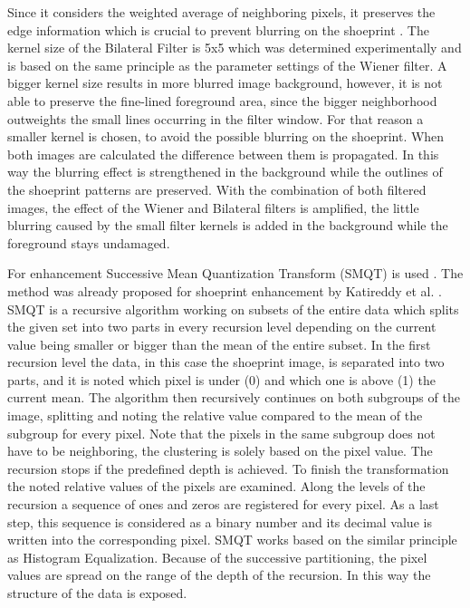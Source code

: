 \documentclass[draft,final]{vutinfth} %
\begin{document}
Since it considers the weighted average of neighboring pixels, it preserves the edge information which is crucial to prevent blurring on the shoeprint \cite{elad2002origin}. 
The kernel size of the Bilateral Filter is 5x5 which was determined experimentally and is based on the same principle as the parameter settings of the Wiener filter.
A bigger kernel size results in more blurred image background, however, it is not able to preserve the fine-lined foreground area, since the bigger neighborhood outweights the small lines occurring in the filter window.
For that reason a smaller kernel is chosen, to avoid the possible blurring on the shoeprint.
When both images are calculated the difference between them is propagated.
In this way the blurring effect is strengthened in the background while the outlines of the shoeprint patterns are preserved.
With the combination of both filtered images, the effect of the Wiener and Bilateral filters is amplified, the little blurring caused by the small filter kernels is added in the background while the foreground stays undamaged.
\par
For enhancement Successive Mean Quantization Transform (SMQT) is used \cite{nilsson2013smqt}.
The method was already proposed for shoeprint enhancement by Katireddy et al. \cite{katireddy2017novel}.
SMQT is a recursive algorithm working on subsets of the entire data which splits the given set into two parts in every recursion level depending on the current value being smaller or bigger than the mean of the entire subset.
In the first recursion level the data, in this case the shoeprint image, is separated into two parts, and it is noted which pixel is under (0) and which one is above (1) the current mean.
The algorithm then recursively continues on both subgroups of the image, splitting and noting the relative value compared to the mean of the subgroup  for every pixel.
Note that the pixels in the same subgroup does not have to be neighboring, the clustering is solely based on the pixel value.
The recursion stops if the predefined depth is achieved.
To finish the transformation the noted relative values of the pixels are examined.
Along the levels of the recursion a sequence of ones and zeros are registered for every pixel.
As a last step, this sequence is considered as a binary number and its decimal value is written into the corresponding pixel.
SMQT works based on the similar principle as Histogram Equalization.
Because of the successive partitioning, the pixel values are spread on the range of the depth of the recursion.
In this way the structure of the data is exposed.
\end{document}

